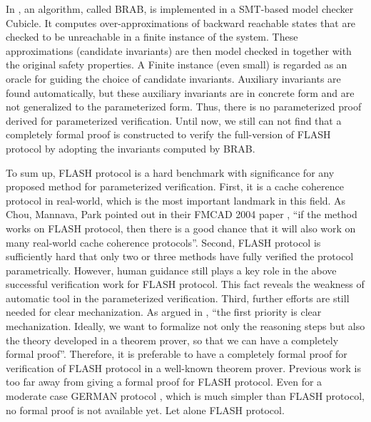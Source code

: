 \documentclass{llncs}
\newcommand{\bedt}[1]{{\color{blue}#1}}
\begin{document}
\bedt{In \cite{cubeicBeyond}, an algorithm, called BRAB, is implemented in a SMT-based model checker Cubicle.  It} computes over-approximations of
backward reachable states that are checked to be unreachable in
a finite instance of the system. These approximations (candidate
invariants) are then model checked in together with the original
safety properties. A Finite instance (even small) is regarded as
an oracle for guiding the choice of candidate
invariants. Auxiliary invariants are found automatically, but these auxiliary invariants are in concrete form and are not generalized to the parameterized form. Thus, there is no  parameterized proof derived for parameterized verification. Until now, we still can not find that a completely formal proof is constructed to verify the full-version of FLASH protocol by adopting the invariants computed by BRAB. %

To sum up,  FLASH protocol is a hard  benchmark with significance for any proposed method for parameterized verification. First, it is a cache coherence protocol in real-world, which is  the most important landmark in this field.  As Chou, Mannava, Park pointed out in their FMCAD 2004 paper \cite{Chou2004}, ``if the method works on FLASH protocol, then there is a good chance that it will also work on many real-world cache coherence protocols''. Second,
FLASH protocol is  sufficiently hard that only two or three methods have  fully verified
the protocol parametrically. However, human guidance still plays a key role in the above successful verification work for FLASH protocol. This fact reveals  the weakness of automatic tool in the parameterized verification.  Third, further  efforts are still needed for clear mechanization. As argued in \cite{Chou2004}, ``the first priority is clear mechanization. Ideally, we want to formalize not only the reasoning
steps  but also the theory developed in a theorem
prover, so that we can have a completely formal proof''. Therefore, it is preferable to  have a completely formal proof for verification of FLASH protocol in a well-known theorem prover. Previous work is too far away from giving a formal proof for FLASH protocol. Even for a moderate case GERMAN protocol \cite{Arons2001}, which is much simpler than FLASH protocol, no formal proof is not available yet. Let alone FLASH protocol.
\end{document}
